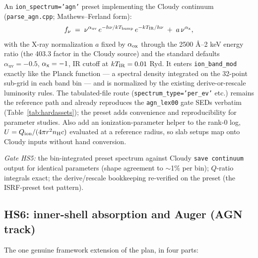 \documentclass[english,a4paper]{my_memo}
\newcommand{\code}[1]{\texttt{#1}}
\begin{document}
An \code{ion\_spectrum='agn'} preset implementing the Cloudy continuum
(\code{parse\_agn.cpp}; Mathews--Ferland form):
\begin{equation}
 f_\nu \;=\; \nu^{\alpha_{\text{uv}}}\,
   e^{-h\nu/kT_{\rm bump}}\, e^{-kT_{\rm IR}/h\nu}
   \;+\; a\,\nu^{\alpha_{\rm x}} ,
 \label{eq:agnsed}
\end{equation}
with the X-ray normalization $a$ fixed by $\alpha_{\rm ox}$ through the
2500 \AA--2 keV energy ratio (the 403.3 factor in the Cloudy source)
and the standard defaults $\alpha_{\text{uv}}=-0.5$,
$\alpha_{\rm x}=-1$, IR cutoff at $kT_{\rm IR}=0.01$ Ryd.  It enters
\code{ion\_band\_mod} exactly like the Planck function --- a spectral
density integrated on the 32-point sub-grid in each band bin --- and is
normalized by the existing derive-or-rescale luminosity rules.  The
tabulated-file route (\code{spectrum\_type='per\_ev'} etc.) remains the
reference path and already reproduces the \code{agn\_lex00} gate SEDs
verbatim (Table~\ref{tab:hardassets}); the preset adds convenience and
reproducibility for parameter studies.  Also add an
ionization-parameter helper to the rank-0 log,
$U = Q_{\rm ion}/(4\pi r^2 n_{\rm H} c)$ evaluated at a reference
radius, so slab setups map onto Cloudy inputs without hand conversion.

\emph{Gate HS5:} the bin-integrated preset spectrum against Cloudy
\code{save continuum} output for identical parameters (shape agreement
to $\sim$1\% per bin); $Q$-ratio integrals exact; the derive/rescale
bookkeeping re-verified on the preset (the ISRF-preset test pattern).

\subsection{HS6: inner-shell absorption and Auger (AGN track)}

The one genuine framework extension of the plan, in four parts:
\end{document}
